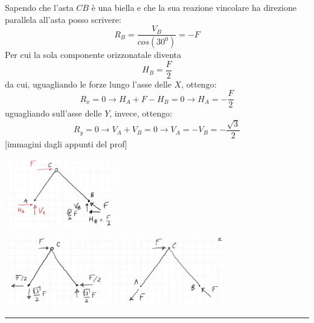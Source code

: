 Sapendo che l'asta $CB$ è una biella e che la sua reazione vincolare ha direzione parallela all'asta posso scrivere:
\[
    R_B = \frac{V_B}{cos(30^0)} = -F
\]
Per cui la sola componente orizzonatale diventa 
\[
    H_B = \frac{F}{2}
\]
da cui, uguagliando le forze lungo l'asse delle $X$, ottengo:
\[
    R_x = 0 \rightarrow  H_A + F - H_B = 0 \rightarrow H_A = -\frac{F}{2}
\]
uguagliando sull'asse delle $Y$, invece, ottengo:
\[
    R_y = 0 \rightarrow  V_A + V_B = 0 \rightarrow V_A = - V_B = - \frac{\sqrt{3}}{2}
\]
[immagini dagli appunti del prof]
\begin{center}
    \includegraphics[height=3cm]{../lezione7/img5.JPG}
\end{center}
\begin{center}
    \includegraphics[height=3cm]{../lezione7/img6.JPG}
\end{center}
\rule{\textwidth}{0,4pt}

